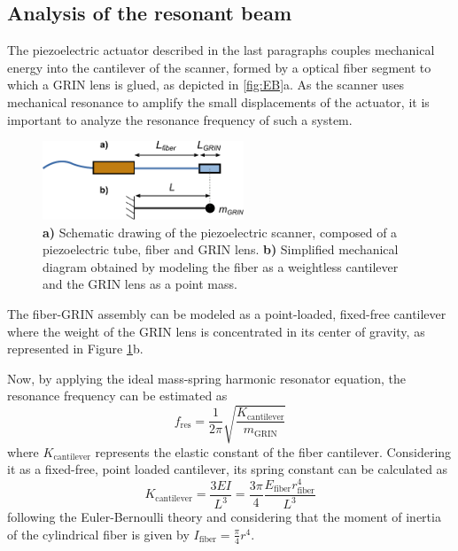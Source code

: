 \documentclass[10pt]{iopart}
\begin{document}
\subsection{Analysis of the resonant beam}
\label{sec:EB}
The piezoelectric actuator described in the last paragraphs couples mechanical energy into the cantilever of the scanner, formed by a optical fiber segment to which a GRIN lens is glued, as depicted in \autoref{fig:EB}a. As the scanner uses mechanical resonance to amplify the small displacements of the actuator, it is important to analyze the resonance frequency of such a system. 

\begin{figure}[h!]\centering
      \includegraphics[width=6cm]{figures/EB.pdf}
      \caption{\textbf{a)} Schematic drawing of the piezoelectric scanner, composed of a piezoelectric tube, fiber and GRIN lens. 
      \textbf{b)} Simplified mechanical diagram obtained by modeling the fiber as a weightless cantilever and the GRIN lens as a point mass.}
      \label{fig:EB}
\end{figure}

The fiber-GRIN assembly can be modeled as a point-loaded, fixed-free cantilever where the weight of the GRIN lens is concentrated in its center of gravity, as represented in Figure \ref{fig:EB}b. 

Now, by applying the ideal mass-spring harmonic resonator equation, the resonance frequency can be estimated as 
\begin{equation}
f_\mathrm{res} = \frac{1}{2 \pi} \sqrt{\frac{K_\mathrm{cantilever}}{m_{\mathrm{GRIN}}}} 
\label{eq:fres}
\end{equation}
where $K_\mathrm{cantilever}$ represents the elastic constant of the fiber cantilever. Considering it as a fixed-free, point loaded cantilever, its spring constant can be calculated as 
\begin{equation}
K_\mathrm{cantilever} = \frac{3 E I}{L^3} = \frac{3 \pi}{4} \frac{E_\mathrm{fiber} r_\mathrm{fiber}^4}{L^3}
\label{eq:EB}
\end{equation}
following the Euler-Bernoulli theory \cite{MarcJ.Madou2011} and considering that the moment of inertia of the cylindrical fiber is given by $I_\mathrm{fiber} = \frac{\pi}{4} r^4$. 
 
\end{document}
